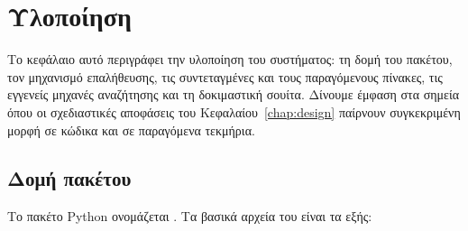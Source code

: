 \chapter{Υλοποίηση}
\label{chap:implementation}

Το κεφάλαιο αυτό περιγράφει την υλοποίηση του συστήματος: τη δομή του πακέτου, τον μηχανισμό επαλήθευσης, τις συντεταγμένες και τους παραγόμενους πίνακες, τις εγγενείς μηχανές αναζήτησης και τη δοκιμαστική σουίτα. Δίνουμε έμφαση στα σημεία όπου οι σχεδιαστικές αποφάσεις του Κεφαλαίου~\ref{chap:design} παίρνουν συγκεκριμένη μορφή σε κώδικα και σε παραγόμενα τεκμήρια.

\section{Δομή πακέτου}
\label{sec:implementation-package}
Το πακέτο Python ονομάζεται . Τα βασικά αρχεία του είναι τα εξής:

